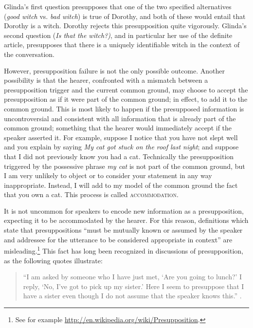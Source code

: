 Glinda’s first question presupposes that one of the two specified alternatives (\textit{good witch} vs. \textit{bad witch}) is true of Dorothy, and both of these would entail that Dorothy is a witch. Dorothy rejects this presupposition quite vigorously. Glinda’s second question (\textit{Is that the witch?)}, and in particular her use of the definite article, presupposes that there is a uniquely identifiable witch in the context of the conversation.



However, presupposition failure is not the only possible outcome. Another possibility is that the hearer, confronted with a mismatch between a presupposition trigger and the current common ground, may choose to accept the presupposition as if it were part of the common ground; in effect, to add it to the common ground. This is most likely to happen if the presupposed information is uncontroversial and consistent with all information that is already part of the common ground; something that the hearer would immediately accept if the speaker asserted it. For example, suppose I notice that you have not slept well and you explain by saying \textit{My cat got stuck on the roof last night}; and suppose that I did not previously know you had a cat. Technically the presupposition triggered by the possessive phrase \textit{my cat} is not part of the common ground, but I am very unlikely to object or to consider your statement in any way inappropriate. Instead, I will add to my model of the common ground the fact that you own a cat. This process is called \textsc{accommodation}.



It is not uncommon for speakers to encode new information as a presupposition, expecting it to be accommodated by the hearer. For this reason, definitions which state that presuppositions “must be mutually known or assumed by the speaker and addressee for the utterance to be considered appropriate in context” are misleading.\footnote{See for example \url{http://en.wikipedia.org/wiki/Presupposition}.} This fact has long been recognized in discussions of presupposition, as the following quotes illustrate:


\begin{quote}
“I am asked by someone who I have just met, ‘Are you going to lunch?’ I reply, ‘No, I’ve got to pick up my sister.’ Here I seem to presuppose that I have a sister even though I do not assume that the speaker knows this.” \citep[202]{Stalnaker1974}. 
\end{quote}

